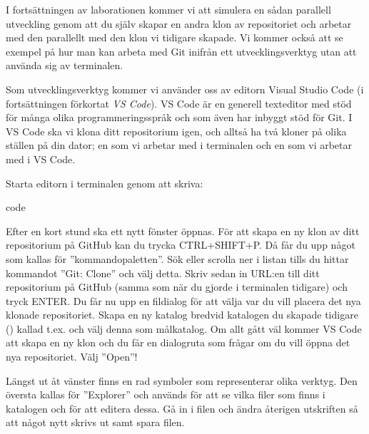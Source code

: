 \begin{Datorarbete}
	I fortsättningen av laborationen kommer vi att simulera en sådan parallell utveckling genom att du själv skapar en andra klon av repositoriet och arbetar med den parallellt med den klon vi tidigare skapade. Vi kommer också att se exempel på hur man kan arbeta med Git inifrån ett utvecklingsverktyg utan att använda sig av terminalen.


	Som utvecklingsverktyg kommer vi använder oss av editorn Visual Studio Code (i fortsättningen förkortat \emph{VS Code}). VS Code är en generell texteditor med stöd för många olika programmeringsspråk och som även har inbyggt stöd för Git. I VS Code ska vi klona ditt repositorium igen, och alltså ha två kloner på olika ställen på din dator; en som vi arbetar med i terminalen och en som vi arbetar med i VS Code.

	Starta editorn i terminalen genom att skriva:

	\begin{Code}
		code
	\end{Code}

	Efter en kort stund ska ett nytt fönster öppnas. För att skapa en ny klon av ditt repositorium på GitHub kan du trycka CTRL+SHIFT+P. Då får du upp något som kallas för ''kommandopaletten''. Sök eller scrolla ner i listan tills du hittar kommandot ''Git: Clone'' och välj detta. Skriv sedan in URL:en till ditt repositorium på GitHub (samma som när du gjorde  i terminalen tidigare) och tryck ENTER. Du får nu upp en fildialog för att välja var du vill placera det nya klonade repositoriet. Skapa en ny katalog bredvid katalogen du skapade tidigare () kallad t.ex.  och välj denna som målkatalog. Om allt gått väl kommer VS Code att skapa en ny klon och du får en dialogruta som frågar om du vill öppna det nya repositoriet. Välj ''Open''!

	\item Längst ut åt vänster finns en rad symboler som representerar olika verktyg. Den översta kallas för ''Explorer'' och används för att se vilka filer som finns i katalogen och för att editera dessa. Gå in i filen  och ändra återigen utskriften så att något nytt skrivs ut samt spara filen.


\end{Datorarbete}

